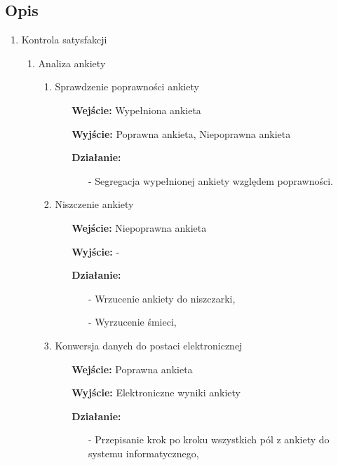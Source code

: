 \documentclass[a4paper, 11pt]{article}
\begin{document}
	
	


	\subsection{Opis}
	\begin{enumerate}[label*=\arabic*.]
		\item Kontrola satysfakcji
		\begin{enumerate}[label*=\arabic*.]
			\item Analiza ankiety
			\begin{enumerate}[label*=\arabic*.]
				\item Sprawdzenie poprawności ankiety
				\begin{itemize}
					\item[\textbf{Wejście:}]	Wypełniona ankieta 
					\item[\textbf{Wyjście:}]	Poprawna ankieta, Niepoprawna ankieta
					\item[\textbf{Działanie:}] 
					\begin{itemize}
						\item[-] Segregacja wypełnionej ankiety względem poprawności.
					\end{itemize}										
				\end{itemize}				
				\item Niszczenie ankiety
				\begin{itemize}			
					\item[\textbf{Wejście:}] Niepoprawna ankieta
					\item[\textbf{Wyjście:}] -
					\item[\textbf{Działanie:}]
					\begin{itemize}
						\item[-] Wrzucenie ankiety do niszczarki,
						\item[-] Wyrzucenie śmieci,
					\end{itemize}										
				\end{itemize}				
				\item Konwersja danych do postaci elektronicznej
				\begin{itemize}
					\item[\textbf{Wejście:}] Poprawna ankieta
					\item[\textbf{Wyjście:}] Elektroniczne wyniki ankiety
					\item[\textbf{Działanie:}] 
					\begin{itemize}
						\item[-] Przepisanie krok po kroku wszystkich pól z ankiety do systemu informatycznego,

\end{itemize}
\end{itemize}
\end{enumerate}
\end{enumerate}
\end{enumerate}
\end{document}
